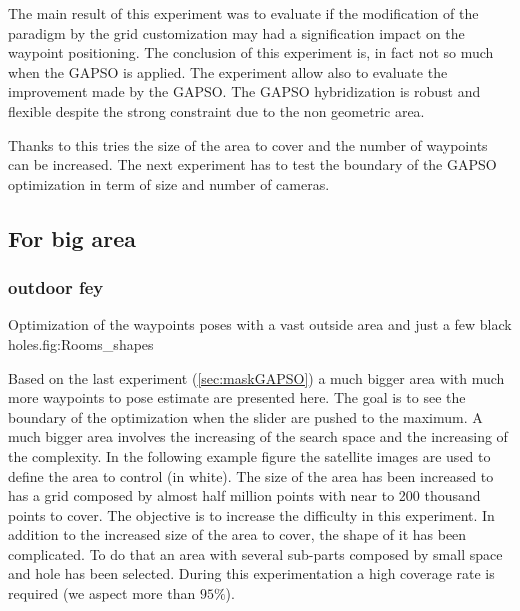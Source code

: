 The main result of this experiment was to evaluate if the modification of the paradigm by the grid customization may had a signification impact on the waypoint positioning. The conclusion of this experiment is, in fact not so much when the GAPSO is applied. The experiment  allow also to evaluate the improvement made  by the GAPSO. The GAPSO hybridization is robust and flexible despite the strong constraint due to the non geometric area.  

Thanks to this tries the size of the area to cover and the number of waypoints can be increased. The next experiment has to test the boundary of the GAPSO optimization in term of size and number of cameras.


	\subsection{For big area}
	
		\subsubsection{outdoor fey}\label{sec:fey_map}

\begin{mfigures}[!]{ Optimization of the waypoints poses with a vast outside area and just a few  black holes.}{fig:Rooms_shapes} \centering
{}
\hspace{1cm}
\hspace{1cm}
\tabsimuposeFley
\end{mfigures}


Based on the last experiment (\ref{sec:maskGAPSO}) a much bigger area with much more waypoints to pose estimate are presented here. The goal is to see the boundary of the optimization when the slider  are pushed to the maximum.
		A much bigger area involves the increasing of the search space and the increasing of the complexity. 
In the following example figure  the satellite images are used to define the area to control (in white).  The size of the area has been increased to has a grid composed by almost half million points with near to 200 thousand points to cover. 
The objective is to increase the difficulty in this experiment. In addition to the increased size of the area to cover, the shape of it has been complicated. To do that an area with several sub-parts composed by small space and hole has been selected.
During this experimentation a high coverage rate is required (we aspect more than $95\%$). 

